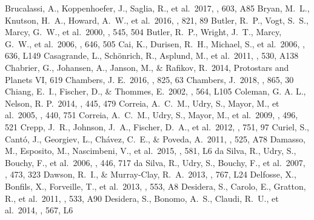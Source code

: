 \documentclass[twocolumn]{aastex62}
\begin{document}
\begin{CJK*}{UTF8}{min}
\begin{thebibliography}{}
 Brucalassi, A., Koppenhoefer, J., Saglia, R., et al.\ 2017, \aap, 603, A85
 Bryan, M.~L., Knutson, H.~A., Howard, A.~W., et al.\ 2016, \apj, 821, 89
 Butler, R.~P., Vogt, S.~S., Marcy, G.~W., et al.\ 2000, \apj, 545, 504
 Butler, R.~P., Wright, J.~T., Marcy, G.~W., et al.\ 2006, \apj, 646, 505
 Cai, K., Durisen, R.~H., Michael, S., et al.\ 2006, \apjl, 636, L149
 Casagrande, L., Sch{\"o}nrich, R., Asplund, M., et al.\ 2011, \aap, 530, A138
 Chabrier, G., Johansen, A., Janson, M., \& Rafikov, R.\ 2014, Protostars and Planets VI, 619
 Chambers, J. E.\ 2016, \apj, 825, 63
 Chambers, J.\ 2018, \apj, 865, 30
 Chiang, E.~I., Fischer, D., \& Thommes, E.\ 2002, \apjl, 564, L105
 Coleman, G. A. L., Nelson, R. P.\ 2014, \mnras, 445, 479
 Correia, A.~C.~M., Udry, S., Mayor, M., et al.\ 2005, \aap, 440, 751
 Correia, A.~C.~M., Udry, S., Mayor, M., et al.\ 2009, \aap, 496, 521
 Crepp, J.~R., Johnson, J.~A., Fischer, D.~A., et al.\ 2012, \apj, 751, 97
 Curiel, S., Cant{\'o}, J., Georgiev, L., Ch{\'a}vez, C.~E., \& Poveda, A.\ 2011, \aap, 525, A78
 Damasso, M., Esposito, M., Nascimbeni, V., et al.\ 2015, \aap, 581, L6
 da Silva, R., Udry, S., Bouchy, F., et al.\ 2006, \aap, 446, 717
 da Silva, R., Udry, S., Bouchy, F., et al.\ 2007, \aap, 473, 323
 Dawson, R.~I., \& Murray-Clay, R.~A.\ 2013, \apjl, 767, L24
 Delfosse, X., Bonfils, X., Forveille, T., et al.\ 2013, \aap, 553, A8
 Desidera, S., Carolo, E., Gratton, R., et al.\ 2011, \aap, 533, A90
 Desidera, S., Bonomo, A.~S., Claudi, R.~U., et al.\ 2014, \aap, 567, L6

\end{thebibliography}
\end{CJK*}
\end{document}
